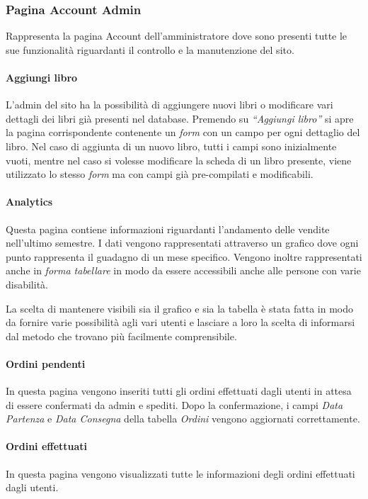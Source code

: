 \subsubsection{Pagina Account Admin}
Rappresenta la pagina Account dell’amministratore dove sono presenti tutte le sue funzionalità riguardanti il controllo e la manutenzione del sito.

\paragraph{Aggiungi libro}
L’admin del sito ha la possibilità di aggiungere nuovi libri o modificare vari dettagli dei libri già presenti nel database. Premendo su \textit{“Aggiungi libro”} si apre la pagina corrispondente contenente un \textit{form} con un campo per ogni dettaglio del libro. Nel caso di aggiunta di un nuovo libro, tutti i campi sono inizialmente vuoti, mentre nel caso si volesse modificare la scheda di un libro presente, viene utilizzato lo stesso \textit{form} ma con campi già pre-compilati e modificabili.

\paragraph{Analytics}
Questa pagina contiene informazioni riguardanti l’andamento delle vendite nell'ultimo semestre. I dati vengono rappresentati attraverso un grafico dove ogni punto rappresenta il guadagno di un mese specifico. Vengono inoltre rappresentati anche in \textit{forma tabellare} in modo da essere accessibili anche alle persone con varie disabilità.

La scelta di mantenere visibili sia il grafico e sia la tabella è stata fatta in modo da fornire varie possibilità agli vari utenti e lasciare a loro la scelta di informarsi dal metodo che trovano più facilmente comprensibile.

\paragraph{Ordini pendenti}
In questa pagina vengono inseriti tutti gli ordini effettuati dagli utenti in attesa di essere confermati da admin e spediti. Dopo la confermazione, i campi \textit{Data Partenza} e \textit{Data Consegna} della tabella \textit{Ordini} vengono aggiornati correttamente.

\paragraph{Ordini effettuati}
In questa pagina vengono visualizzati tutte le informazioni degli ordini effettuati dagli utenti.

